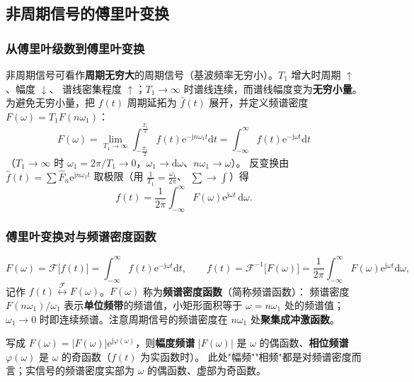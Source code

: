 \subsection{非周期信号的傅里叶变换}

\subsubsection{从傅里叶级数到傅里叶变换}

非周期信号可看作\textbf{周期无穷大}的周期信号（基波频率无穷小）。$T_1$ 增大时周期 $\uparrow$、幅度 $\downarrow$、
谱线密集程度 $\uparrow$；$T_1\to\infty$ 时谱线连续，而谱线幅度变为\textbf{无穷小量}。
为避免无穷小量，把 $f(t)$ 周期延拓为 $\hat f(t)$ 展开，并定义频谱密度 $F(\omega)=T_1F(n\omega_1)$：
\begin{equation}
F(\omega)=\lim_{T_1\to\infty}\int_{-\frac{T_1}{2}}^{\frac{T_1}{2}}f(t)\mathrm{e}^{-\mathrm{j}n\omega_1t}\mathrm{d}t
=\int_{-\infty}^{\infty}f(t)\mathrm{e}^{-\mathrm{j}\omega t}\mathrm{d}t
\end{equation}
（$T_1\to\infty$ 时 $\omega_1=2\pi/T_1\to0$，$\omega_1\to\mathrm{d}\omega$、$n\omega_1\to\omega$）。
反变换由 $\hat f(t)=\sum\hat F_n\mathrm{e}^{\mathrm{j}n\omega_1t}$ 取极限（用 $\frac{1}{T_1}=\frac{\omega_1}{2\pi}$、
$\sum\to\int$）得
\begin{equation}
f(t)=\frac{1}{2\pi}\int_{-\infty}^{\infty}F(\omega)\mathrm{e}^{\mathrm{j}\omega t}\,\mathrm{d}\omega .
\end{equation}

\subsubsection{傅里叶变换对与频谱密度函数}

\begin{equation}
F(\omega)=\mathcal{F}\big[f(t)\big]=\int_{-\infty}^{\infty}f(t)\mathrm{e}^{-\mathrm{j}\omega t}\mathrm{d}t,\qquad
f(t)=\mathcal{F}^{-1}\big[F(\omega)\big]=\frac{1}{2\pi}\int_{-\infty}^{\infty}F(\omega)\mathrm{e}^{\mathrm{j}\omega t}\mathrm{d}\omega,
\end{equation}
记作 $f(t)\overset{\mathcal{F}}{\longleftrightarrow}F(\omega)$。$F(\omega)$ 称为\textbf{频谱密度函数}（简称频谱函数）：
频谱密度 $F(n\omega_1)/\omega_1$ 表示\textbf{单位频带}的频谱值，小矩形面积等于 $\omega=n\omega_1$ 处的频谱值；
$\omega_1\to0$ 时即连续频谱。注意周期信号的频谱密度在 $n\omega_1$ 处\textbf{聚集成冲激函数}。

写成 $F(\omega)=|F(\omega)|\mathrm{e}^{\mathrm{j}\varphi(\omega)}$，则\textbf{幅度频谱} $|F(\omega)|$
是 $\omega$ 的偶函数、\textbf{相位频谱} $\varphi(\omega)$ 是 $\omega$ 的奇函数（$f(t)$ 为实函数时）。
此处"幅频""相频"都是对频谱密度而言；实信号的频谱密度实部为 $\omega$ 的偶函数、虚部为奇函数。

